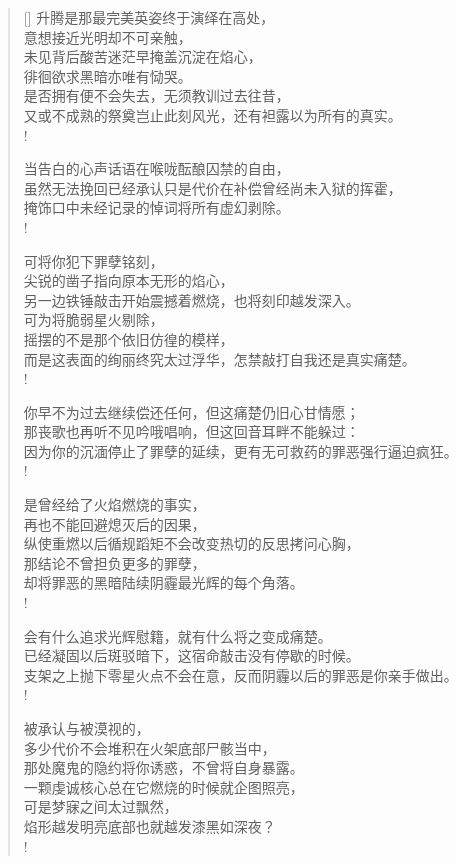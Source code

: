 \documentclass[UTF8, 12pt, a4paper]{ctexrep} %
\begin{document}
\begin{verse}[\versewidth]
升腾是那最完美英姿终于演绎在高处，\\
意想接近光明却不可亲触，\\
未见背后酸苦迷茫早掩盖沉淀在焰心，\\
徘徊欲求黑暗亦唯有恸哭。\\
是否拥有便不会失去，无须教训过去往昔，\\
又或不成熟的祭奠岂止此刻风光，还有袒露以为所有的真实。\\!

当告白的心声话语在喉咙酝酿囚禁的自由，\\
虽然无法挽回已经承认只是代价在补偿曾经尚未入狱的挥霍，\\
掩饰口中未经记录的悼词将所有虚幻剥除。\\!

可将你犯下罪孽铭刻，\\
尖锐的凿子指向原本无形的焰心，\\
另一边铁锤敲击开始震撼着燃烧，也将刻印越发深入。\\
可为将脆弱星火剔除，\\
摇摆的不是那个依旧仿徨的模样，\\
而是这表面的绚丽终究太过浮华，怎禁敲打自我还是真实痛楚。\\!

你早不为过去继续偿还任何，但这痛楚仍旧心甘情愿；\\
那丧歌也再听不见吟哦唱响，但这回音耳畔不能躲过：\\
因为你的沉湎停止了罪孽的延续，更有无可救药的罪恶强行逼迫疯狂。\\!

是曾经给了火焰燃烧的事实，\\
再也不能回避熄灭后的因果，\\
纵使重燃以后循规蹈矩不会改变热切的反思拷问心胸，\\
那结论不曾担负更多的罪孽，\\
却将罪恶的黑暗陆续阴霾最光辉的每个角落。\\!

会有什么追求光辉慰籍，就有什么将之变成痛楚。\\
已经凝固以后斑驳暗下，这宿命敲击没有停歇的时候。\\
支架之上抛下零星火点不会在意，反而阴霾以后的罪恶是你亲手做出。\\!

被承认与被漠视的，\\
多少代价不会堆积在火架底部尸骸当中，\\
那处魔鬼的隐约将你诱惑，不曾将自身暴露。\\
一颗虔诚核心总在它燃烧的时候就企图照亮，\\
可是梦寐之间太过飘然，\\
焰形越发明亮底部也就越发漆黑如深夜？\\!


\end{verse}
\end{document}
